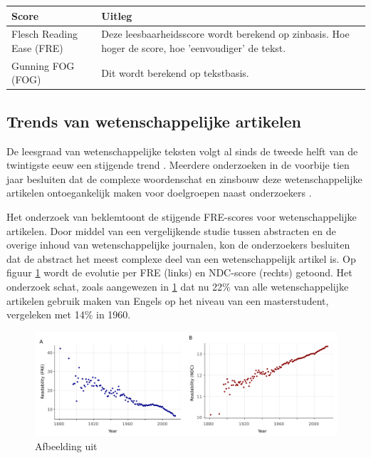 \begin{center}
	\begin{tabular}{ | m{8cm} | m{8cm} | } 
		\hline
		\textbf{Score} & \textbf{Uitleg} \\ 
		\hline
		Flesch Reading Ease (FRE) & Deze leesbaarheidsscore wordt berekend op zinbasis. Hoe hoger de score, hoe 'eenvoudiger' de tekst. \\
		\hline
		Gunning FOG (FOG) & Dit wordt berekend op tekstbasis. \\
		\hline
	\end{tabular}
	\label{table:readability-scores}
\end{center}

\subsection{Trends van wetenschappelijke artikelen}

De leesgraad van wetenschappelijke teksten volgt al sinds de tweede helft van de twintigste eeuw een stijgende trend \autocite{Hayes1992}. Meerdere onderzoeken in de voorbije tien jaar besluiten dat de complexe woordenschat en zinsbouw deze wetenschappelijke artikelen ontoegankelijk maken voor doelgroepen naast onderzoekers \autocite{Ball2017, PlavenSigray2017, Jones2019}. 

\medspace

Het onderzoek van \textcite{PlavenSigray2017} beklemtoont de stijgende FRE-scores voor wetenschappelijke artikelen. Door middel van een vergelijkende studie tussen abstracten en de overige inhoud van wetenschappelijke journalen, kon de onderzoekers besluiten dat de abstract het meest complexe deel van een wetenschappelijk artikel is.  Op figuur \ref{img:fre-ndc} wordt de evolutie per FRE (links) en NDC-score (rechts) getoond. Het onderzoek schat, zoals aangewezen in \ref{img:fre-ndc} dat nu 22\% van alle wetenschappelijke artikelen gebruik maken van Engels op het niveau van een masterstudent, vergeleken met 14\% in 1960. 

\begin{figure}[H]
	\includegraphics[width=\linewidth]{img/fre-ndc.png}
	\caption{Afbeelding uit \textcite{PlavenSigray2017}}
	\label{img:fre-ndc}
\end{figure}


